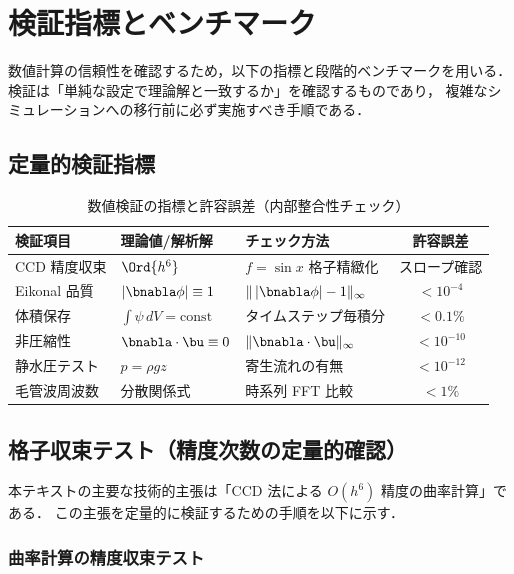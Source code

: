 \section{検証指標とベンチマーク}
\label{sec:verification}

数値計算の信頼性を確認するため，以下の指標と段階的ベンチマークを用いる．
検証は「単純な設定で理論解と一致するか」を確認するものであり，
複雑なシミュレーションへの移行前に必ず実施すべき手順である．

\subsection{定量的検証指標}

\begin{table}[htbp]
\centering
\caption{数値検証の指標と許容誤差（内部整合性チェック）}
\label{tab:verification}
\begin{tabular}{p{35mm}p{40mm}p{35mm}c}
\toprule
検証項目 & 理論値/解析解 & チェック方法 & 許容誤差 \\
\midrule
CCD 精度収束 & $\Ord{h^6}$ & $f=\sin x$ 格子精緻化 & スロープ確認\\
Eikonal 品質 & $|\bnabla\phi| \equiv 1$ & $\|\,|\bnabla\phi|-1\|_\infty$ & $< 10^{-4}$\\
体積保存 & $\int\psi\,dV = \text{const}$ & タイムステップ毎積分 & $< 0.1\%$\\
非圧縮性 & $\bnabla\cdot\bu \equiv 0$ & $\|\bnabla\cdot\bu\|_\infty$ & $< 10^{-10}$\\
静水圧テスト & $p = \rho g z$ & 寄生流れの有無 & $< 10^{-12}$\\
毛管波周波数 & 分散関係式 & 時系列 FFT 比較 & $< 1\%$\\
\bottomrule
\end{tabular}
\end{table}

\subsection{格子収束テスト（精度次数の定量的確認）}
\label{sec:grid_convergence}

本テキストの主要な技術的主張は「CCD 法による $O(h^6)$ 精度の曲率計算」である．
この主張を定量的に検証するための手順を以下に示す．

\subsubsection{曲率計算の精度収束テスト}

